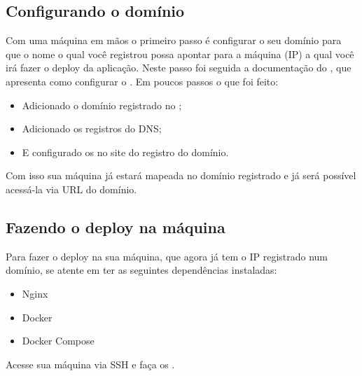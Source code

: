 \documentclass[letterpaper,10pt,english]{sphinxmanual}
\begin{document}
\subsection{Configurando o domínio}
\label{\detokenize{deploy:configurando-o-dominio}}
Com uma máquina em mãos o primeiro passo é configurar o seu domínio para que o nome o qual você registrou possa apontar para a máquina (IP) a qual você irá fazer o deploy da aplicação.
Neste passo foi seguida a documentação do , que apresenta como configurar o .
Em poucos passos o que foi feito:
\begin{itemize}
\item {} 
Adicionado o domínio registrado no ;

\item {} 
Adicionado os registros do DNS;

\item {} 
E configurado os  no site do registro do domínio.

\end{itemize}

Com isso sua máquina já estará mapeada no domínio registrado e já será possível acessá-la via URL do domínio.


\subsection{Fazendo o deploy na máquina}
\label{\detokenize{deploy:fazendo-o-deploy-na-maquina}}
Para fazer o deploy na sua máquina, que agora já tem o IP registrado num domínio, se atente em ter as seguintes dependências instaladas:
\begin{itemize}
\item {} 
Nginx

\item {} 
Docker

\item {} 
Docker Compose

\end{itemize}

Acesse sua máquina via SSH e faça os .
\end{document}
